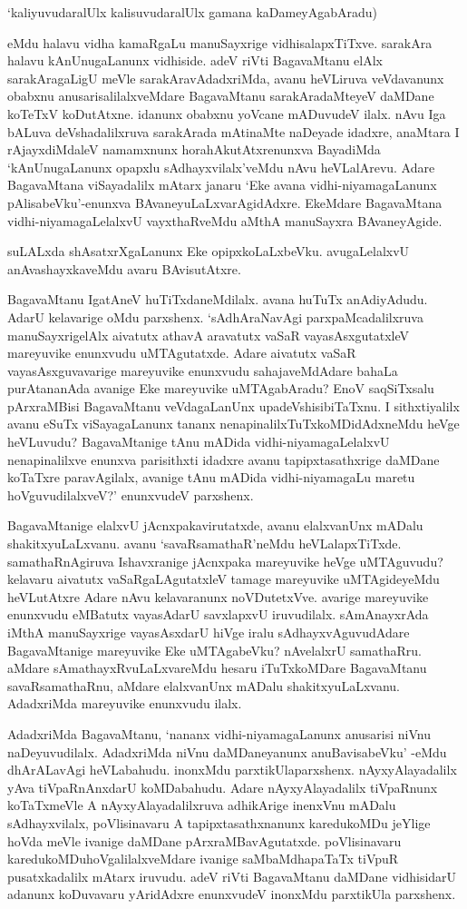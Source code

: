 `kaliyuvudaralUlx kalisuvudaralUlx gamana kaDameyAgabAradu)

eMdu halavu vidha kamaRgaLu manuSayxrige vidhisalapxTiTxve. sarakAra halavu kAnUnugaLanunx vidhiside. adeV riVti BagavaMtanu elAlx sarakAragaLigU meVle sarakAravAdadxriMda, avanu heVLiruva veVdavanunx obabxnu anusarisalilalxveMdare BagavaMtanu sarakAradaMteyeV daMDane koTeTxV koDutAtxne. idanunx obabxnu yoVcane mADuvudeV ilalx. nAvu Iga bALuva deVshadalilxruva sarakArada mAtinaMte naDeyade idadxre, anaMtara I rAjayxdiMdaleV namamxnunx horahAkutAtxrenunxva BayadiMda `kAnUnugaLanunx opapxlu sAdhayxvilalx'veMdu nAvu heVLalArevu. Adare BagavaMtana viSayadalilx mAtarx janaru `Eke avana vidhi-niyamagaLanunx pAlisabeVku'-enunxva BAvaneyuLaLxvarAgidAdxre. EkeMdare BagavaMtana vidhi-niyamagaLelalxvU vayxthaRveMdu aMthA manuSayxra BAvaneyAgide.

suLALxda shAsatxrXgaLanunx Eke opipxkoLaLxbeVku. avugaLelalxvU anAvashayxkaveMdu avaru BAvisutAtxre.

BagavaMtanu IgatAneV huTiTxdaneMdilalx. avana huTuTx anAdiyAdudu. AdarU kelavarige oMdu parxshenx. `sAdhAraNavAgi parxpaMcadalilxruva manuSayxrigelAlx aivatutx athavA aravatutx vaSaR vayasAsxgutatxleV mareyuvike enunxvudu uMTAgutatxde. Adare aivatutx vaSaR vayasAsxguvavarige mareyuvike enunxvudu sahajaveMdAdare bahaLa purAtananAda avanige Eke mareyuvike uMTAgabAradu? EnoV saqSiTxsalu pArxraMBisi BagavaMtanu veVdagaLanUnx upadeVshisibiTaTxnu. I sithxtiyalilx avanu eSuTx viSayagaLanunx tananx nenapinalilxTuTxkoMDidAdxneMdu heVge heVLuvudu? BagavaMtanige tAnu mADida vidhi-niyamagaLelalxvU nenapinalilxve enunxva parisithxti idadxre avanu tapipxtasathxrige daMDane koTaTxre paravAgilalx, avanige tAnu mADida vidhi-niyamagaLu maretu hoVguvudilalxveV?' enunxvudeV parxshenx.

BagavaMtanige elalxvU jAcnxpakavirutatxde, avanu elalxvanUnx mADalu shakitxyuLaLxvanu. avanu `savaRsamathaR'neMdu heVLalapxTiTxde. samathaRnAgiruva Ishavxranige jAcnxpaka mareyuvike heVge uMTAguvudu? kelavaru aivatutx vaSaRgaLAgutatxleV tamage mareyuvike uMTAgideyeMdu heVLutAtxre Adare nAvu kelavaranunx noVDutetxVve. avarige mareyuvike enunxvudu eMBatutx vayasAdarU savxlapxvU iruvudilalx. sAmAnayxrAda iMthA manuSayxrige vayasAsxdarU hiVge iralu sAdhayxvAguvudAdare BagavaMtanige mareyuvike Eke uMTAgabeVku? nAvelalxrU samathaRru. aMdare sAmathayxRvuLaLxvareMdu hesaru iTuTxkoMDare BagavaMtanu savaRsamathaRnu, aMdare elalxvanUnx mADalu shakitxyuLaLxvanu. AdadxriMda mareyuvike enunxvudu ilalx.

AdadxriMda BagavaMtanu, `nananx vidhi-niyamagaLanunx anusarisi niVnu naDeyuvudilalx. AdadxriMda niVnu daMDaneyanunx anuBavisabeVku' -eMdu dhArALavAgi heVLabahudu. inonxMdu parxtikUlaparxshenx. nAyxyAlayadalilx yAva tiVpaRnAnxdarU koMDabahudu. Adare nAyxyAlayadalilx tiVpaRnunx koTaTxmeVle A nAyxyAlayadalilxruva adhikArige inenxVnu mADalu sAdhayxvilalx, poVlisinavaru A tapipxtasathxnanunx karedukoMDu jeYlige hoVda meVle ivanige daMDane pArxraMBavAgutatxde. poVlisinavaru karedukoMDuhoVgalilalxveMdare ivanige saMbaMdhapaTaTx tiVpuR pusatxkadalilx mAtarx iruvudu. adeV riVti BagavaMtanu daMDane vidhisidarU adanunx koDuvavaru yAridAdxre enunxvudeV inonxMdu parxtikUla parxshenx.

